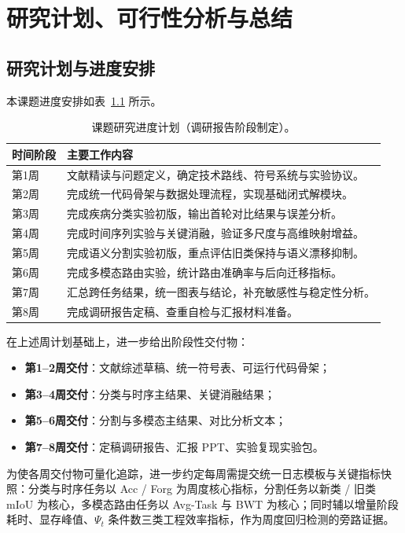 
\chapter{研究计划、可行性分析与总结}

\section{研究计划与进度安排}

本课题进度安排如表~\ref{tab:plan} 所示。

\begin{table}[htbp]
\centering
\caption{课题研究进度计划（调研报告阶段制定）。}
\label{tab:plan}
\begin{tabular}{p{2.8cm}p{9.2cm}}
\toprule
时间阶段 & 主要工作内容 \\
\midrule
第1周 & 文献精读与问题定义，确定技术路线、符号系统与实验协议。 \\
第2周 & 完成统一代码骨架与数据处理流程，实现基础闭式解模块。 \\
第3周 & 完成疾病分类实验初版，输出首轮对比结果与误差分析。 \\
第4周 & 完成时间序列实验与关键消融，验证多尺度与高维映射增益。 \\
第5周 & 完成语义分割实验初版，重点评估旧类保持与语义漂移抑制。 \\
第6周 & 完成多模态路由实验，统计路由准确率与后向迁移指标。 \\
第7周 & 汇总跨任务结果，统一图表与结论，补充敏感性与稳定性分析。 \\
第8周 & 完成调研报告定稿、查重自检与汇报材料准备。 \\
\bottomrule
\end{tabular}
\end{table}

在上述周计划基础上，进一步给出阶段性交付物：
\begin{itemize}
    \item \textbf{第1--2周交付}：文献综述草稿、统一符号表、可运行代码骨架；
    \item \textbf{第3--4周交付}：分类与时序主结果、关键消融结果；
    \item \textbf{第5--6周交付}：分割与多模态主结果、对比分析文本；
    \item \textbf{第7--8周交付}：定稿调研报告、汇报 PPT、实验复现实验包。
\end{itemize}

为使各周交付物可量化追踪，进一步约定每周需提交统一日志模板与关键指标快照：分类与时序任务以 Acc / Forg 为周度核心指标，分割任务以新类 / 旧类 mIoU 为核心，多模态路由任务以 Avg-Task 与 BWT 为核心；同时辅以增量阶段耗时、显存峰值、$\Psi_t$ 条件数三类工程效率指标，作为周度回归检测的旁路证据。

